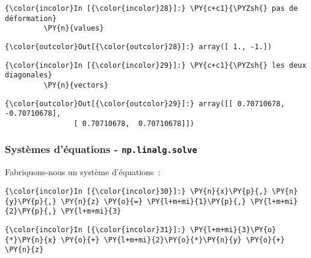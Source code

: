     \begin{Verbatim}[commandchars=\\\{\},frame=single,framerule=0.3mm,rulecolor=\color{cellframecolor}]
{\color{incolor}In [{\color{incolor}28}]:} \PY{c+c1}{\PYZsh{} pas de déformation}
         \PY{n}{values}
\end{Verbatim}


\begin{Verbatim}[commandchars=\\\{\},frame=single,framerule=0.3mm,rulecolor=\color{cellframecolor}]
{\color{outcolor}Out[{\color{outcolor}28}]:} array([ 1., -1.])
\end{Verbatim}
            
    \begin{Verbatim}[commandchars=\\\{\},frame=single,framerule=0.3mm,rulecolor=\color{cellframecolor}]
{\color{incolor}In [{\color{incolor}29}]:} \PY{c+c1}{\PYZsh{} les deux diagonales}
         \PY{n}{vectors}
\end{Verbatim}


\begin{Verbatim}[commandchars=\\\{\},frame=single,framerule=0.3mm,rulecolor=\color{cellframecolor}]
{\color{outcolor}Out[{\color{outcolor}29}]:} array([[ 0.70710678, -0.70710678],
                [ 0.70710678,  0.70710678]])
\end{Verbatim}
            
    \hypertarget{systuxe8mes-duxe9quations---np.linalg.solve}{%
\subsubsection{\texorpdfstring{Systèmes d'équations -
\texttt{np.linalg.solve}}{Systèmes d'équations - np.linalg.solve}}\label{systuxe8mes-duxe9quations---np.linalg.solve}}

    Fabriquons-nous un système d'équations~:

    \begin{Verbatim}[commandchars=\\\{\},frame=single,framerule=0.3mm,rulecolor=\color{cellframecolor}]
{\color{incolor}In [{\color{incolor}30}]:} \PY{n}{x}\PY{p}{,} \PY{n}{y}\PY{p}{,} \PY{n}{z} \PY{o}{=} \PY{l+m+mi}{1}\PY{p}{,} \PY{l+m+mi}{2}\PY{p}{,} \PY{l+m+mi}{3}
\end{Verbatim}


    \begin{Verbatim}[commandchars=\\\{\},frame=single,framerule=0.3mm,rulecolor=\color{cellframecolor}]
{\color{incolor}In [{\color{incolor}31}]:} \PY{l+m+mi}{3}\PY{o}{*}\PY{n}{x} \PY{o}{+} \PY{l+m+mi}{2}\PY{o}{*}\PY{n}{y} \PY{o}{+} \PY{n}{z}
\end{Verbatim}


